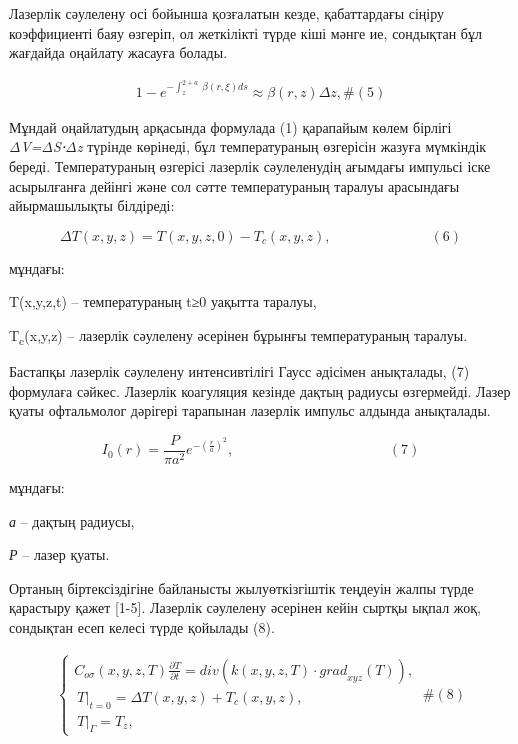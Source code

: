 Лазерлік сәулелену осі бойынша қозғалатын кезде, қабаттардағы сіңіру
коэффициенті баяу өзгеріп, ол жеткілікті түрде кіші мәнге ие, сондықтан
бұл жағдайда оңайлату жасауға болады.

\[\begin{array}{r}
1 - e^{- \int_{z}^{2 + a}\mspace{2mu}\mspace{2mu}\beta(r,\xi)ds} \approx \beta(r,z)\Delta z,\#(5)
\end{array}\]

Мұндай оңайлатудың арқасында формулада (1) қарапайым көлем бірлігі
\emph{ΔV=ΔS⋅Δz} түрінде көрінеді, бұл температураның өзгерісін жазуға
мүмкіндік береді. Температураның өзгерісі лазерлік сәулеленудің ағымдағы
импульсі іске асырылғанға дейінгі және сол сәтте температураның таралуы
арасындағы айырмашылықты білдіреді:

\[\Delta T(x,y,z) = T(x,y,z,0) - T_{c}(x,y,z),\ \ \ \ \ \ \ \ \ \ \ \ \ \ \ \ \ \ \ \ \ \ \ \ \ \ \ \ \ \ \ \ (6)\]

мұндағы:

T(x,y,z,t) -- температураның t≥0 уақытта таралуы,

T\textsubscript{c}(x,y,z) -- лазерлік сәулелену әсерінен бұрынғы
температураның таралуы.

Бастапқы лазерлік сәулелену интенсивтілігі Гаусс әдісімен анықталады,
(7) формулаға сәйкес. Лазерлік коагуляция кезінде дақтың радиусы
өзгермейді. Лазер қуаты офтальмолог дәрігері тарапынан лазерлік импульс
алдында анықталады.

\[I_{0}(r) = \frac{P}{\pi a^{2}}e^{- \left( \frac{r}{a} \right)^{2}},\ \ \ \ \ \ \ \ \ \ \ \ \ \ \ \ \ \ \ \ \ \ \ \ \ \ \ \ \ \ \ \ \ \ \ \ \ \ \ \ \ \ \ \ \ \ \ \ \ \ (7)\]

мұндағы:

\emph{а} -- дақтың радиусы,

\emph{Р} -- лазер қуаты.

Ортаның біртексіздігіне байланысты жылуөткізгіштік теңдеуін жалпы түрде
қарастыру қажет {[}1-5{]}. Лазерлік сәулелену әсерінен кейін сыртқы
ықпал жоқ, сондықтан есеп келесі түрде қойылады (8).

\[\begin{array}{r}
\left\{ \begin{matrix}
C_{o\sigma}(x,y,z,T)\frac{\partial T}{\partial t} = div\left( k(x,y,z,T) \cdot {grad}_{xyz}(T) \right), \\
\left. \ T \right|_{t = 0} = \Delta T(x,y,z) + T_{c}(x,y,z), \\
\left. \ T \right|_{\Gamma} = T_{z},
\end{matrix} \right.\ \#(8)
\end{array}\]

